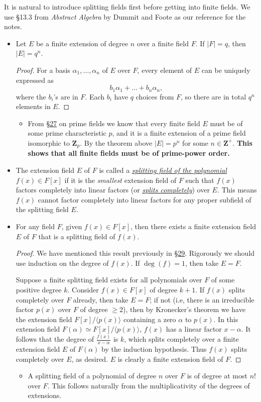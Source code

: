 \documentclass[11pt]{article}
\newcommand{\lk}[2]{\hyperlink{subsection.#1.#2}{\S#2}} %
\newcommand{\Z}{\mathbf{Z}}
\newcommand{\df}[1]{\ul{\textit{\textsf{#1}}}}
\newcommand{\la}{\langle}
\newcommand{\ra}{\rangle}
\begin{document}
It is natural to introduce splitting fields first before getting into finite fields. We use \S13.3 from \textit{Abstract Algebra} by Dummit and Foote as our reference for the notes.
\begin{itemize}
    \item Let $E$ be a finite extension of degree $n$ over a finite field $F$. If $|F| = q$, then $|E| = q^n$.
    \begin{proof}
        For a basis $\alpha_1,\dots,\alpha_n$ of $E$ over $F$, every element of $E$ can be uniquely expressed as \[b_1\alpha_1 + \dots + b_n\alpha_n,\] where the $b_i$'s are in $F$. Each $b_i$ have $q$ choices from $F$, so there are in total $q^n$ elements in $E$.
    \end{proof}
    \begin{itemize}
        \item From \lk{5}{27} on prime fields we know that every finite field $E$ must be of some prime characteristic $p$, and it is a finite extension of a prime field isomorphic to $\Z_p$. By the theorem above $|E| = p^n$ for some $n \in \Z^+$. \textbf{This shows that all finite fields must be of prime-power order.}
    \end{itemize}
    \item The extension field $E$ of $F$ is called a \df{splitting field of the polynomial $f(x) \in F[x]$} if it is the \emph{smallest} extension field of $F$ such that $f(x)$ factors completely into linear factors (or \df{splits completely}) over $E$. This means $f(x)$ cannot factor completely into linear factors for any proper subfield of the splitting field $E$.
    \item For any field $F$, given $f(x) \in F[x]$, then there exists a finite extension field $E$ of $F$ that is a splitting field of $f(x)$.
    \begin{proof}
        We have mentioned this result previously in \lk{6}{29}. Rigorously we should use induction on the degree of $f(x)$. If $\deg(f) = 1$, then take $E = F$.
        
        Suppose a finite splitting field exists for all polynomials over $F$ of some positive degree $k$. Consider $f(x) \in F[x]$ of degree $k+1$. If $f(x)$ splits completely over $F$ already, then take $E = F$; if not (i.e, there is an irreducible factor $p(x)$ over $F$ of degree $\geq 2$), then by Kronecker's theorem we have the extension field $F[x]/\la p(x) \ra$ containing a zero $\alpha$ to $p(x)$. In this extension field $F(\alpha) \simeq F[x]/\la p(x) \ra$, $f(x)$ has a linear factor $x - \alpha$. It follows that the degree of $\frac{f(x)}{x-\alpha}$ is $k$, which splits completely over a finite extension field $E$ of $F(\alpha)$ by the induction hypothesis. Thus $f(x)$ splits completely over $E$, as desired. $E$ is clearly a finite extension field of $F$.
    \end{proof}
    \begin{itemize}
        \item A splitting field of a polynomial of degree $n$ over $F$ is of degree at most $n!$ over $F$. This follows naturally from the multiplicativity of the degrees of extensions. 
    \end{itemize}
    

\end{itemize}
\end{document}
